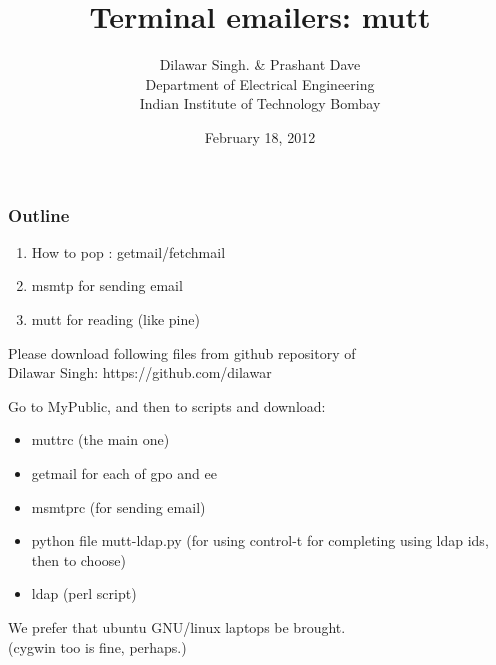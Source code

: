 \documentclass[10pt,mathserif]{beamer}
\title[mutt/pine/pop/bash]{Terminal emailers: mutt}
\author[Dilawar \& Prashant]{Dilawar Singh. \&
			Prashant Dave\\
                        $\;$\\
Department of Electrical Engineering\\
Indian Institute of Technology Bombay}
\institute[IIT Bombay]{ }
\date[]{February 18, 2012}
\begin{document}


\begin{frame}
\maketitle
\end{frame}

\begin{frame}
 \frametitle{Outline}
\begin{enumerate}
 \item How to pop : getmail/fetchmail
\item msmtp for sending email 
\item mutt for reading (like pine)
\end{enumerate}
\end{frame}

\begin{frame}
Please download following files from github repository of\\
Dilawar Singh: https://github.com/dilawar

Go to MyPublic, and then to scripts and download:

\begin{itemize}
\item muttrc (the main one)
\item getmail for each of gpo and ee
\item msmtprc (for sending email)

\item python file mutt-ldap.py  (for using control-t for completing using ldap ids, then
   to choose)

\item ldap (perl script)
\end{itemize}

We prefer that ubuntu GNU/linux laptops be brought.\\

(cygwin too is fine, perhaps.)

\end{frame}
\end{document}
